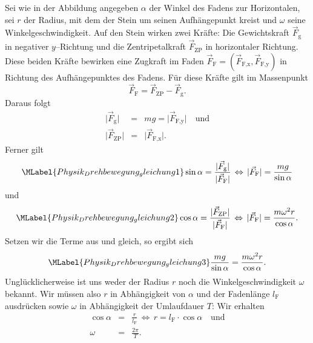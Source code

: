 \begin{MExercises}
\begin{MExercise}
  \begin{MSolution}
  Sei wie in der Abbildung angegeben $\alpha$ der Winkel des Fadens zur Horizontalen, sei $r$ der Radius, mit dem der Stein um seinen Aufh\"angepunkt kreist und $\omega$ seine Winkelgeschwindigkeit. Auf den Stein wirken zwei Kr\"afte: Die Gewichtskraft $\vec{F}_{\textrm{g}}$ in negativer $y$--Richtung und die Zentripetalkraft $\vec{F}_{\textrm{ZP}}$ in horizontaler Richtung. Diese beiden Kr\"afte bewirken eine Zugkraft im Faden $\vec{F}_{\textrm{F}}=(\vec{F}_{\textrm{F,x}},\vec{F}_{\textrm{F,y}})$ in Richtung des Aufh\"angepunktes des Fadens. F\"ur diese Kr\"afte gilt im Massenpunkt 
  $$
  \vec{F}_{\textrm{F}}=\vec{F}_{\textrm{ZP}}-\vec{F}_{\textrm{g}}.
  $$
  Daraus folgt
  \begin{eqnarray*}
  \vert\vec{F}_{\textrm{g}}\vert&=&mg=\vert\vec{F}_{\textrm{F,y}}\vert\quad\text{und}\\
  \vert\vec{F}_{\textrm{ZP}}\vert&=&\vert\vec{F}_{\textrm{F,x}}\vert.
  \end{eqnarray*} Ferner gilt
  \begin{equation}\MLabel{Physik_Drehbewegung_gleichung1}
  \sin\alpha=\frac{\vert\vec{F}_{\textrm{g}}\vert}{\vert\vec{F}_{\textrm{F}}\vert}\,\Leftrightarrow\, \vert\vec{F}_{\textrm{F}}\vert=\frac{mg}{\sin\alpha} 
  \end{equation} und
  \begin{equation}\MLabel{Physik_Drehbewegung_gleichung2}
  \cos\alpha=\frac{\vert\vec{F}_{\textrm{ZP}}\vert}{\vert\vec{F}_{\textrm{F}}\vert}\,\Leftrightarrow\, \vert\vec{F}_{\textrm{F}}\vert=\frac{m\omega^2r}{\cos\alpha}.
  \end{equation} Setzen wir die Terme aus  und  gleich, so ergibt sich
  \begin{equation}\MLabel{Physik_Drehbewegung_gleichung3}
  \frac{mg}{\sin\alpha}=\frac{m\omega^2r}{\cos\alpha}.
  \end{equation} Ungl\"ucklicherweise ist uns weder der Radius $r$ noch die Winkelgeschwindigkeit $\omega$ bekannt. Wir m\"ussen also $r$ in Abh\"angigkeit von $\alpha$ und der Fadenl\"ange $l_{\textrm{F}}$ ausdr\"ucken sowie $\omega$ in Abh\"angigkeit der Umlaufdauer $T$: Wir erhalten
  \begin{eqnarray*}
    \cos\alpha&=&\frac{r}{l_{\textrm{F}}}\,\Leftrightarrow\, r=l_{\textrm{F}}\cdot\cos\alpha\quad\text{und}\\
    \omega&=&\frac{2\pi}{T}.
  \end{eqnarray*}

\end{MSolution}
\end{MExercise}
\end{MExercises}
